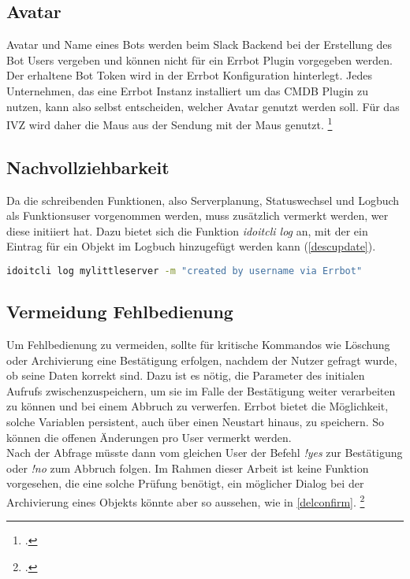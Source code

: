 \subsection{Avatar}
Avatar und Name eines Bots werden beim Slack Backend bei der Erstellung des Bot Users vergeben und können nicht für ein Errbot Plugin vorgegeben werden. Der erhaltene Bot Token wird in der Errbot Konfiguration hinterlegt. Jedes Unternehmen, das eine Errbot Instanz installiert um das \acs{CMDB} Plugin zu nutzen, kann also selbst entscheiden, welcher Avatar genutzt werden soll. Für das IVZ wird daher die Maus aus der Sendung mit der Maus genutzt. 
\footcite[Vgl.][o. \pno]{Slack_2019_Bots}

\subsection{Nachvollziehbarkeit} \label{Nachvollziehbarkeit}
Da die schreibenden Funktionen, also Serverplanung, Statuswechsel und Logbuch als Funktionsuser vorgenommen werden, muss zusätzlich vermerkt werden, wer diese initiiert hat. Dazu bietet sich die Funktion \textit{idoitcli log} an, mit der ein Eintrag für ein Objekt im Logbuch hinzugefügt werden kann (\autoref{descupdate}). 

\begin{lstlisting}[language=bash, label=descupdate, caption=Hinzufügen eines Logbuch Eintrages]
idoitcli log mylittleserver -m "created by username via Errbot"
\end{lstlisting}

\subsection{Vermeidung Fehlbedienung}
Um Fehlbedienung zu vermeiden, sollte für kritische Kommandos wie Löschung oder Archivierung eine Bestätigung erfolgen, nachdem der Nutzer gefragt wurde, ob seine Daten korrekt sind. Dazu ist es nötig, die Parameter des initialen Aufrufs zwischenzuspeichern, um sie im Falle der Bestätigung weiter verarbeiten zu können und bei einem Abbruch zu verwerfen. Errbot bietet die Möglichkeit, solche Variablen persistent, auch über einen Neustart hinaus, zu speichern. So können die offenen Änderungen pro User vermerkt werden.\\
Nach der Abfrage müsste dann vom gleichen User der Befehl \textit{!yes} zur Bestätigung oder \textit{!no} zum Abbruch folgen. Im Rahmen dieser Arbeit ist keine Funktion vorgesehen, die eine solche Prüfung benötigt, ein möglicher Dialog bei der Archivierung eines Objekts könnte aber so aussehen, wie in \autoref{delconfirm}. 
\footcite[Vgl.][o. \pno]{errbot_2018_persistence}

